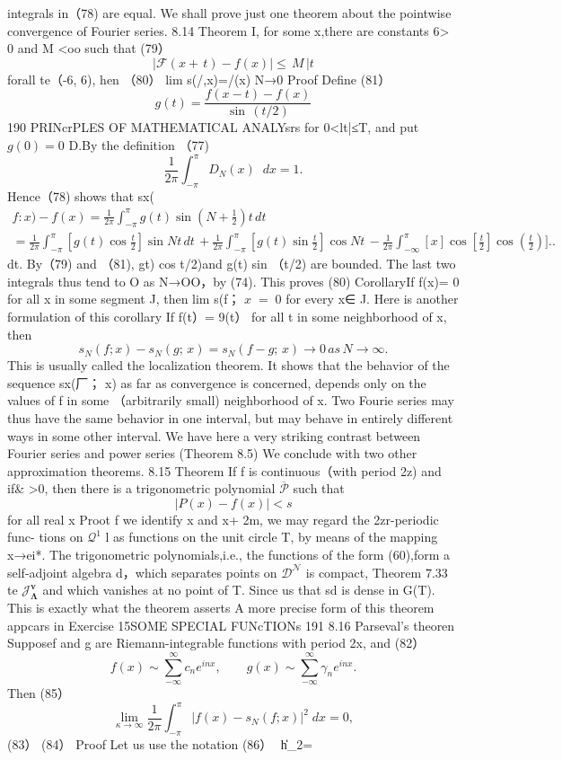 integrals in（78) are equal. We shall prove just one theorem about the pointwise convergence of Fourier series. 8.14 Theorem I, for some x,there are constants 6> 0 and M <oo such that (79） $$ \left|{\mathcal{F}}(x+\,t)-f(x)\right|\leq\,M\, |t $$ forall te（-6, 6), hen （80） lim s(/,x)=/(x) N→0 Proof Define (81） $$ g(t)=\frac{f(x-t)-f(x)}{\sin\,(t/2)} $$190 PRINcrPLES OF MATHEMATICAL ANALYsrs for 0<lt|≤T, and put $g(0)=0$ D.By the definition （77) $$ \frac{1}{2\pi}\int_{-\pi}^{\pi}D_{N}(x)\;\;d x=1. $$ Hence（78) shows that sx( $$ \begin{array}{l}{{f\colon x)-f(x)=\displaystyle\frac{1}{2\pi}\int_{-\pi}^{\pi}g(t)\sin\left(N+\displaystyle\frac{1}{2}\right)t\,d t}}\\ {{\displaystyle=\displaystyle\frac{1}{2\pi}\int_{-\pi}^{\pi}\left[g(t)\cos\displaystyle\frac{t}{2}\right]\sin N t\,d t\,+\displaystyle\frac{1}{2\pi}\int_{-\pi}^{\pi}\left[g(t)\sin\displaystyle\frac{t}{2}\right]\cos N t\,-\displaystyle\frac{1}{2\pi}\int_{-\infty}^{\pi}\left[x\right]\cos\left[\left.\frac{t}{2}\right]\cos\right.\left({\frac{t}{2}}\right) ] . .}}\end{array} $$ dt. By（79) and （81), gt) cos t/2)and g(t) sin （t/2) are bounded. The last two integrals thus tend to O as N→OO，by (74). This proves (80) CorollaryIf f(x)= 0 for all x in some segment J, then lim s(f； $\scriptstyle x\;=\;0$ for every x∈ J. Here is another formulation of this corollary If f(t）= 9(t） for all t in some neighborhood of x, then $$ s_{N}(f;x)-s_{N}(g;\,x)=s_{N}(f-g;\,x)\to0\,a s\,N\to\infty. $$ This is usually called the localization theorem. It shows that the behavior of the sequence {sx(厂； x)} as far as convergence is concerned, depends only on the values of f in some （arbitrarily small) neighborhood of x. Two Fourie series may thus have the same behavior in one interval, but may behave in entirely different ways in some other interval. We have here a very striking contrast between Fourier series and power series (Theorem 8.5) We conclude with two other approximation theorems. 8.15 Theorem If f is continuous（with period 2z) and if& >0, then there is a trigonometric polynomial $\overline{{{\mathcal{P}}}}$ such that $$ |P(x)-f(x)|<s $$ for all real x Proot f we identify x and x+ 2m, we may regard the 2zr-periodic func- tions on $\textstyle{\mathcal{Q}}^{1}$ l as functions on the unit circle T, by means of the mapping x→ei*. The trigonometric polynomials,i.e., the functions of the form (60),form a self-adjoint algebra d，which separates points on ${\mathcal{D}}^{\mathcal{N}}$ is compact, Theorem 7.33 te ${\mathcal{J}}_{\mathbf{\Lambda}}^{\mathbf{v}}$ and which vanishes at no point of T. Since us that sd is dense in G(T). This is exactly what the theorem asserts A more precise form of this theorem appcars in Exercise 15SOME SPECIAL FUNcTIONs 191 8.16 Parseval's theoren Supposef and g are Riemann-integrable functions with period 2x, and (82） $$ f(x)\sim\sum_{-\infty}^{\infty}c_{n}e^{i n x},\qquad g(x)\sim\sum_{-\infty}^{\infty}\gamma_{n}e^{i n x}. $$ Then (85） $$ \operatorname*{lim}_{\kappa\to\infty}\frac{1}{2\pi}\int_{-\pi}^{\pi}|f(x)-s_{N}(f;x)|^{2}\;d x=0, $$ (83） (84） Proof Let us use the notation (86） $$ \|h\|_{2}= 
